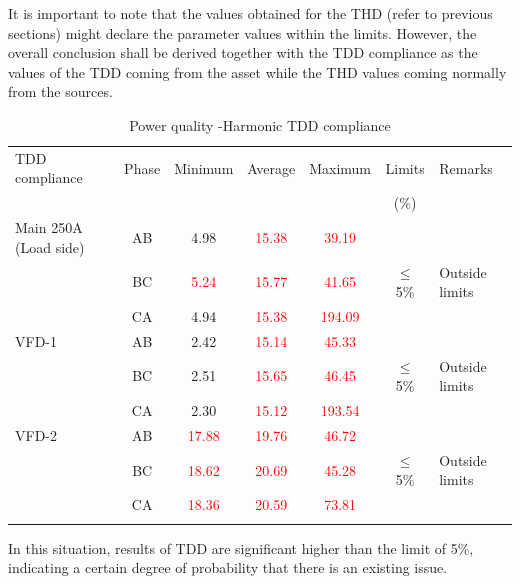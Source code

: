 It is important to note that the values obtained for the THD (refer to previous sections) might declare the parameter values within the limits. However, the overall conclusion shall be derived together with the TDD compliance as the values of the TDD coming from the asset while the THD values coming normally from the sources. 


\begin{table}[!htb]
	\caption{Power quality -Harmonic TDD compliance}
	\label{tbl_ch04_elecaudit_powerquality_tddcompliance}
	{\scriptsize
		
\begin{tabular}{l|c|c|c|c|c|l}
	\hline
	TDD compliance & Phase & Minimum & Average & Maximum & Limits & Remarks \\ 
	&  &  &  &  & (\%) &  \\ 
	\hline
	Main 250A (Load side) & AB & 4.98 & \textcolor{red}{15.38} & \textcolor{red}{39.19} &  &  \\ 
	& BC & \textcolor{red}{5.24} & \textcolor{red}{15.77} & \textcolor{red}{41.65} & $\leq$ 5\% & Outside limits \\ 
	& CA & 4.94 & \textcolor{red}{15.38} & \textcolor{red}{194.09} &  &  \\ 
	\hline
	VFD-1 & AB & 2.42 & \textcolor{red}{15.14} & \textcolor{red}{45.33} &  &  \\ 
	& BC & 2.51 & \textcolor{red}{15.65} & \textcolor{red}{46.45} & $\leq$ 5\% & Outside limits \\ 
	& CA & 2.30 & \textcolor{red}{15.12} & \textcolor{red}{193.54} &  &  \\ 
	\hline
	VFD-2 & AB & \textcolor{red}{17.88} & \textcolor{red}{19.76} & \textcolor{red}{46.72} &  &  \\ 
	& BC & \textcolor{red}{18.62} & \textcolor{red}{20.69} & \textcolor{red}{45.28} & $\leq$ 5\% & Outside limits \\ 
	& CA & \textcolor{red}{18.36} & \textcolor{red}{20.59} & \textcolor{red}{73.81} &  &  \\ 
	\hline
	\multicolumn{7}{l}{} \\ 
\end{tabular}
		
	}%
\end{table}

In this situation, results of TDD are significant higher than the limit of 5\%, indicating a certain degree of probability that there is an existing issue.



